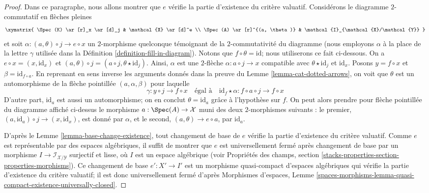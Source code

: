 \begin{proof}
\medskip\noindent
Dans ce paragraphe, nous allons montrer que $e$ vérifie la partie
d'existence du critère valuatif. Considérons le diagramme $2$-commutatif en flèches pleines
$$
\xymatrix{
\Spec(K) \ar[r]_x \ar[d]_j & \mathcal{X} \ar[d]^e \\
\Spec(A) \ar[r]^{(a, \theta)} & \mathcal{I}_{\mathcal{X}/\mathcal{Y}}
}
$$
et soit $\alpha : (a, \theta) \circ j \to e \circ x$ un $2$-morphisme quelconque
témoignant de la $2$-commutativité du diagramme (nous employons $\alpha$ à la place
de la lettre $\gamma$ utilisée dans la Définition \ref{definition-fill-in-diagram}).
Notons que $f \circ \theta = \text{id}$; nous utiliserons ce fait ci-dessous.
On a $e \circ x = (x, \text{id}_x)$ et
$(a, \theta) \circ j = (a \circ j, \theta \star \text{id}_j)$.
Ainsi, $\alpha$ est une $2$-flèche $\alpha : a \circ j \to x$
compatible avec $\theta \star \text{id}_j$ et $\text{id}_x$.
Posons $y = f \circ x$ et $\beta = \text{id}_{f \circ a}$.
En reprenant en sens inverse les arguments donnés dans la preuve du
Lemme \ref{lemma-cat-dotted-arrows},
on voit que $\theta$ est un automorphisme de la
flèche pointillée $(a, \alpha, \beta)$ pour laquelle
$$
\gamma : y \circ j \to f \circ x
\quad\text{égal à}\quad
\text{id}_f \star \alpha : f \circ a \circ j \to f \circ x
$$
D'autre part, $\text{id}_a$ est aussi un automorphisme; on en conclut
$\theta = \text{id}_a$ grâce à l'hypothèse sur $f$.
On peut alors prendre pour flèche pointillée du diagramme affiché ci-dessus
le morphisme $a : \Spec(A) \to \mathcal{X}$ muni des deux $2$-morphismes suivants :
le premier, $(a, \text{id}_a) \circ j \to (x, \text{id}_x)$, est donné par $\alpha$,
et le second, $(a, \theta) \to e \circ a$, par $\text{id}_a$.

\medskip\noindent
D'après le Lemme \ref{lemma-base-change-existence}, tout changement de base de $e$
vérifie la partie d'existence du critère valuatif.
Comme $e$ est représentable par des espaces algébriques, il suffit de
montrer que $e$ est universellement fermé après changement de base
par un morphisme $I \to \mathcal{I}_{\mathcal{X}/\mathcal{Y}}$
surjectif et lisse, où $I$ est un espace algébrique
(voir Propriétés des champs, section
\ref{stacks-properties-section-properties-morphisms}).
Ce changement de base $e' : X' \to I'$ est un
morphisme quasi-compact d'espaces algébriques qui
vérifie la partie d'existence du critère valuatif;
il est donc universellement fermé d'après
Morphismes d'espaces, Lemme
\ref{spaces-morphisms-lemma-quasi-compact-existence-universally-closed}.
\end{proof}






